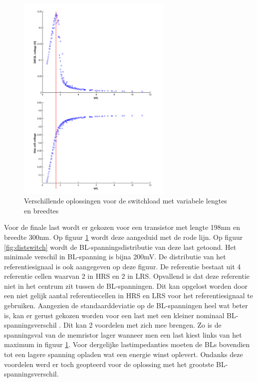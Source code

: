 \begin{figure}[!ht]
  \centering
  \includegraphics[width=0.66\textwidth]{../fig/hfdst-last-length.png}
  \caption[Sweep switchload over transistor lengte en breedte]{Verschillende oplossingen voor de switchload met variabele lengtes en breedtes}
  \label{fig:length}
\end{figure}

Voor de finale last wordt er gekozen voor een transistor met lengte 198nm en breedte 300nm. Op figuur \ref{fig:length} wordt deze aangeduid met de rode lijn. Op figuur \ref{fig:distswitch} wordt de BL-spanningsdistributie van deze last getoond. Het minimale verschil in BL-spanning is bijna 200mV. De distributie van het referentiesignaal is ook aangegeven op deze figuur. De referentie bestaat uit 4 referentie cellen waarvan 2 in HRS en 2 in LRS. Opvallend is dat deze referentie niet in het centrum zit tussen de BL-spanningen. Dit kan opgelost worden door een niet gelijk aantal referentiecellen in HRS en LRS voor het referentiesignaal te gebruiken. Aangezien de standaarddeviatie op de BL-spanningen heel wat beter is, kan er gerust gekozen worden voor een last met een kleiner nominaal BL-spanningsverschil \label{anderelast}. Dit kan 2 voordelen met zich mee brengen. Zo is de spanningsval van de memristor lager wanneer men een last kiest links van het maximum in figuur \ref{fig:length}. Voor dergelijke lastimpedanties moeten de BLs bovendien tot een lagere spanning opladen wat een energie winst oplevert. Ondanks deze voordelen werd er toch geopteerd voor de oplossing met het grootste BL-spanningsverschil.

